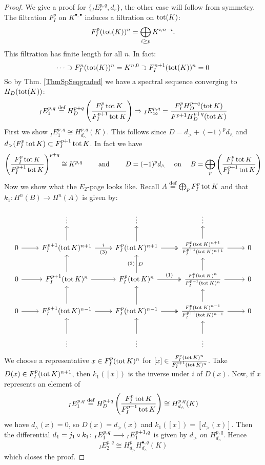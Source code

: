 \documentclass[../main.tex]{subfiles}
\begin{document}
\begin{proof}
    We give a proof for $\{{}_IE_r^{p,q},d_r \}$, the other case will follow from symmetry. 
    The filtration $F^p_I$ on $K^{\bullet,\bullet}$ induces a filtration on $\operatorname{tot}(K)$:
    \[
    F^p_I (\operatorname{tot}(K))^n = \bigoplus_{i \geq p} K^{i,n-i}.
    \]
    This filtration has finite length for all $n$. In fact:
    \[
    \cdots \supset F^n_I (\operatorname{tot}(K))^n = K^{n,0} \supset F_I^{n+1} (\operatorname{tot}(K))^n = 0
    \]
    So by Thm. \ref{ThmSpSeqgraded} we have a spectral sequence converging to $H_D(\operatorname{tot}(K))$:
    \[
    {}_IE_1^{p,q} \stackrel{\text{def}}{=} H_D^{p+q} \left( \frac{F^p_I \operatorname{tot} K}{F^{p+1}_I \operatorname{tot} K} \right) \Rightarrow {}_IE_{\infty}^{p,q} = \frac{F^p_I H_D^{p+q}(\operatorname{tot} K )}{F^{p+1} H_D^{p+q}( \operatorname{tot} K)}
    \]
    First we show ${}_IE_1^{p,q} \cong H^{p,q}_{d_\wedge} (K)$. This follows since $D=d_> + (-1)^p d_\wedge$ and $d_> ( F^p_I \operatorname{tot} K) \subset F^{p+1}_I \operatorname{tot} K $. In fact we have
    \[
     \left( \frac{F^p_I \operatorname{tot} K}{F^{p+1}_I \operatorname{tot} K} \right)^{p+q} \cong K^{p,q} \qquad \text{ and } \qquad D=(-1)^pd_\wedge \quad \text{ on } \quad B= \bigoplus_p  \left( \frac{F^p_I \operatorname{tot} K}{F^{p+1}_I \operatorname{tot} K} \right)
    \]
    Now we show what the $E_2$-page looks like.
    Recall $A \stackrel{\text{def}}{=} \bigoplus_p F^p_I \operatorname{tot} K$ and that $k_1 \colon H^n(B) \to H^n(A)$ is given by:
    
\begin{equation*}
\begin{tikzcd}
 & \vdots & \vdots & \vdots & \\
0 \arrow[r] & F^{p+1}_I (\tot K)^{n+1} \arrow[r,"i","(3)"']   \arrow[u] & F^{p}_I (\tot K)^{n+1} \arrow[r, two heads]  \arrow[u] & \frac{F^{p}_I (\tot K)^{n+1}}{F^{p+1}_I (\tot K)^{n+1}} \arrow[r] \arrow[u] & 0 \\
0 \arrow[r] & F^{p+1}_I (\tot K)^{n} \arrow[r]   \arrow[u] & F^{p}_I (\tot K)^{n} \arrow[r,"(1)", two heads]  \arrow[u,"(2)", "D"'] & \frac{F^{p}_I (\tot K)^{n}}{F^{p+1}_I (\tot K)^{n}} \arrow[r] \arrow[u] & 0 \\
0 \arrow[r] & F^{p+1}_I (\tot K)^{n-1} \arrow[r]   \arrow[u] & F^{p}_I (\tot K)^{n-1} \arrow[r, two heads]  \arrow[u] & \frac{F^{p}_I (\tot K)^{n-1}}{F^{p+1}_I (\tot K)^{n-1}} \arrow[r] \arrow[u] & 0 \\
 & \vdots \arrow[u] & \vdots \arrow[u] & \vdots \arrow[u] &
\end{tikzcd}
\end{equation*}
We choose a representative $x \in F^{p}_I (\operatorname{tot} K)^{n} $ for $[x] \in  \frac{F^{p}_I (\operatorname{tot} K)^{n}}{F^{p+1}_I (\operatorname{tot} K)^{n}} $. Take $D(x) \in F^{p}_I (\operatorname{tot} K)^{n+1} $, then $k_1([x])$ is the inverse under $i$ of $D(x)$.
Now, if $x$ represents an element of
\[
{}_IE_1^{p,q} \stackrel{\text{def}}{=} H_D^{p+q} \left( \frac{F^p_I \operatorname{tot} K}{F^{p+1}_I \operatorname{tot} K} \right) \cong H^{p,q}_{d_\wedge} (K)
\]
we have $d_\wedge(x)=0$, so $D(x)=d_>(x)$ and $k_1([x])=[d_>(x)]$. Then the differential $d_1=j_1 \circ k_1 \colon {}_IE_1^{p,q} \longrightarrow {}_IE_1^{p+1,q} $ is given by $d_>$ on $H^{p,q}_{d_\wedge}$. Hence
\[
 {}_IE_2^{p,q} \cong H^p_{d_>}H^{\bullet,q}_{d_\wedge}(K) 
\]
which closes the proof.
\end{proof}
\end{document}
